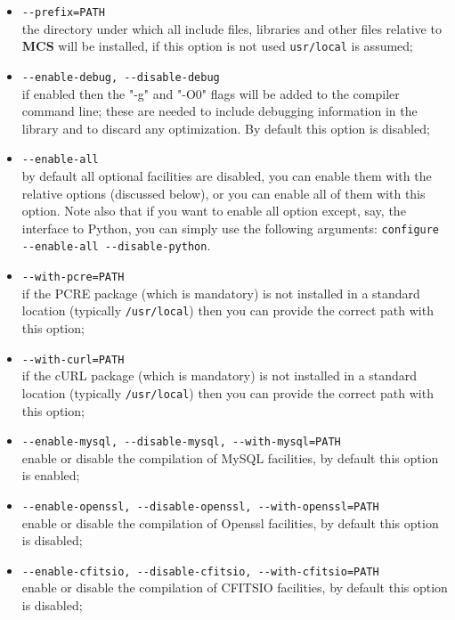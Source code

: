\documentclass[12pt,titlepage]{article}
\newcommand{\mcs}{\textbf{MCS} }
\begin{document}
\begin{itemize}
\item \verb|--prefix=PATH| \\
  the directory under which all include files, libraries and other
  files relative to \mcs will be installed, if this option is not used
  \verb|usr/local| is assumed;

\item \verb|--enable-debug, --disable-debug| \\
  if enabled then the "-g" and "-O0" flags will be added to the
  compiler command line; these are needed to include debugging
  information in the library and to discard any optimization. By
  default this option is disabled;

\item \verb|--enable-all| \\
  by default all optional facilities are disabled, you can enable them
  with the relative options (discussed below), or you can enable all
  of them with this option. Note also that if you want to enable all
  option except, say, the interface to Python, you can simply use the
  following arguments: \verb|configure --enable-all --disable-python|.

\item \verb|--with-pcre=PATH| \\
  if the PCRE package (which is mandatory) is not installed in a
  standard location (typically \verb|/usr/local|) then you can provide
  the correct path with this option;

\item \verb|--with-curl=PATH| \\
  if the cURL package (which is mandatory) is not installed in a
  standard location (typically \verb|/usr/local|) then you can provide
  the correct path with this option;

\item \verb|--enable-mysql, --disable-mysql, --with-mysql=PATH| \\
  enable or disable the compilation of MySQL facilities, by default
  this option is enabled;

\item \verb|--enable-openssl, --disable-openssl, --with-openssl=PATH| \\
  enable or disable the compilation of Openssl facilities, by default
  this option is disabled;

\item \verb|--enable-cfitsio, --disable-cfitsio, --with-cfitsio=PATH| \\
  enable or disable the compilation of CFITSIO facilities, by default
  this option is disabled;


\end{itemize}
\end{document}
